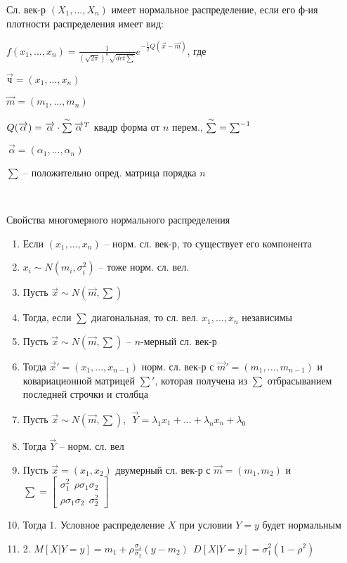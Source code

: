 
\OPR Сл. век-р $(X_1,...,X_n)$ имеет нормальное распределение, если его ф-ия плотности распределения имеет вид:

$f(x_1,...,x_n)=\tfrac{1}{(\sqrt{2\pi})^n\sqrt{det\sum}}e^{-\tfrac{1}{2}Q(\overrightarrow{x}-\overrightarrow{m})}$, где

$\overrightarrow{ч}=(x_1,...,x_n)$

$\overrightarrow{m}=(m_1,...,m_n)$

$Q(\overrightarrow{\alpha})=\overrightarrow{\alpha}\cdot\sum\limits^{\sim}\overrightarrow{\alpha}^T$ квадр форма от $n$ перем., $\sum\limits^{\sim}=\sum^{-1}$

$~\overrightarrow{\alpha}=(\alpha_1,...,\alpha_n)$

$\sum$ -- положительно опред. матрица порядка $n$

~

Свойства многомерного нормального распределения
\begin{enumerate}[topsep=0pt, leftmargin=20pt, noitemsep, label=\arabic*\degree]
	\item Если $(x_1,...,x_n)$ -- норм. сл. век-р, то существует его компонента \item [] $x_i\sim N(m_i,\sigma_i^2)$ -- тоже норм. сл. вел.
	
	\item Пусть $\overrightarrow{x}\sim N(\overrightarrow{m},\sum)$
	\item [] Тогда, если $\sum$ диагональная, то сл. вел. $x_1,...,x_n$ независимы
	
	\item Пусть $\overrightarrow{x}\sim N(\overrightarrow{m},\sum)$ -- $n$-мерный сл. век-р
	\item [] Тогда $\overrightarrow{x}'=(x_1,...,x_{n-1})$ норм. сл. век-р с $\overrightarrow{m}'=(m_1,...,m_{n-1})$ и ковариационной матрицей
	$\sum'$, которая получена из $\sum$ отбрасыванием последней строчки и столбца

	\item Пусть $\overrightarrow{x}\sim N(\overrightarrow{m},\sum), ~~ \overrightarrow{Y}=\lambda_1x_1+...+\lambda_n x_n+\lambda_0$
	\item [] Тогда $\overrightarrow{Y}$ -- норм. сл. вел
	
	\item Пусть $\overrightarrow{x}=(x_1,x_2)$ двумерный сл. век-р с $\overrightarrow{m}=(m_1,m_2)$ и $\sum = 
	\left[\begin{array}{l}
		\sigma_1^2 ~~\rho\sigma_1\sigma_2 \\
		\rho\sigma_1\sigma_2 ~~\sigma_2^2
	\end{array}\right]$
	\item [] Тогда 1. Условное распределение $X$ при условии $Y=y$ будет нормальным
	\item [] 2. $M[X|Y=y]=m_1+\rho\tfrac{\sigma_1}{\sigma_2}(y-m_2)~~D[X|Y=y]=\sigma_1^2(1-\rho^2)$
	
\end{enumerate}

\clearpage
